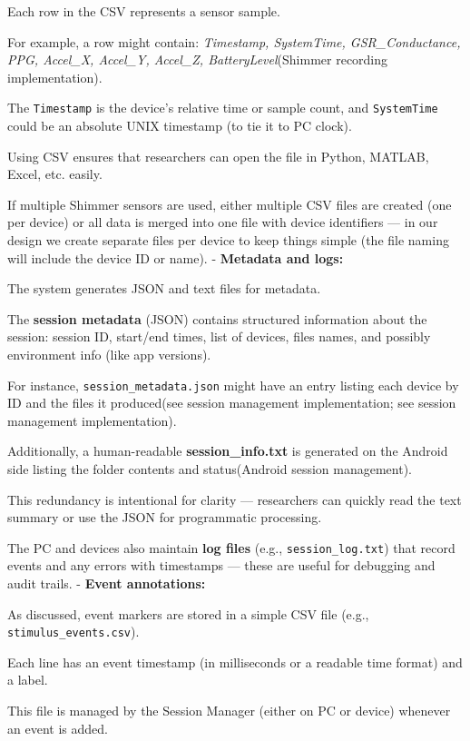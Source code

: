 Each row in the CSV represents a sensor sample.

For example, a row might contain: \textit{Timestamp, SystemTime, GSR\_Conductance, PPG, Accel\_X, Accel\_Y, Accel\_Z, BatteryLevel}(Shimmer recording implementation).

The \texttt{Timestamp} is the device's relative time or sample count, and \texttt{SystemTime} could be an absolute UNIX timestamp (to tie it to PC clock).

Using CSV ensures that researchers can open the file in Python, MATLAB, Excel, etc. easily.

If multiple Shimmer sensors are used, either multiple CSV files are created (one per device) or all data is merged into one file with device identifiers --- in our design we create separate files per device to keep things simple (the file naming will include the device ID or name). - \textbf{Metadata and logs:}

The system generates JSON and text files for metadata.

The \textbf{session metadata}
 (JSON) contains structured information about the session: session ID, start/end times, list of devices, files names, and possibly environment info (like app versions).

For instance, \texttt{session\_metadata.json} might have an entry listing each device by ID and the files it produced(see session management implementation; see session management implementation).

Additionally, a human-readable \textbf{session\_info.txt}
 is generated on the Android side listing the folder contents and status(Android session management).

This redundancy is intentional for clarity --- researchers can quickly read the text summary or use the JSON for programmatic processing.

The PC and devices also maintain \textbf{log files}
 (e.g., \texttt{session\_log.txt}) that record events and any errors with timestamps --- these are useful for debugging and audit trails. - \textbf{Event annotations:}

As discussed, event markers are stored in a simple CSV file (e.g., \texttt{stimulus\_events.csv}).

Each line has an event timestamp (in milliseconds or a readable time format) and a label.

This file is managed by the Session Manager (either on PC or device) whenever an event is added.

